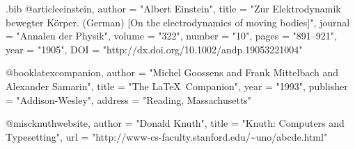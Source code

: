 \documentclass{article}
\begin{document}
\begin{filecontents*}[overwrite]{\jobname.bib}
@article{einstein,
    author =       "Albert Einstein",
    title =        "{Zur Elektrodynamik bewegter K{\"o}rper}. ({German})
        [{On} the electrodynamics of moving bodies]",
    journal =      "Annalen der Physik",
    volume =       "322",
    number =       "10",
    pages =        "891--921",
    year =         "1905",
    DOI =          "http://dx.doi.org/10.1002/andp.19053221004"
}

@book{latexcompanion,
    author    = "Michel Goossens and Frank Mittelbach and Alexander Samarin",
    title     = "The \LaTeX\ Companion",
    year      = "1993",
    publisher = "Addison-Wesley",
    address   = "Reading, Massachusetts"
}

@misc{knuthwebsite,
    author    = "Donald Knuth",
    title     = "Knuth: Computers and Typesetting",
    url       = "http://www-cs-faculty.stanford.edu/\~{}uno/abcde.html"
}
\end{filecontents*}
\end{document}
